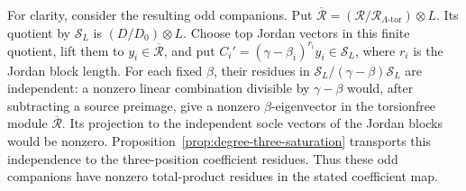 For clarity, consider the resulting odd companions.
Put $\overline{\mathcal R}=
(\mathcal R/\mathcal R_{\Lambda\text{-tor}})\otimes L$.
Its quotient by $\mathcal S_L$ is $(D/D_0)\otimes L$.
Choose top Jordan vectors in this finite quotient,
lift them to $y_i\in\overline{\mathcal R}$, and put
$C_i'=(\gamma-\beta_i)^{r_i}y_i\in\mathcal S_L$,
where $r_i$ is the Jordan block length.
For each fixed $\beta$, their residues in
$\mathcal S_L/(\gamma-\beta)\mathcal S_L$ are independent:
a nonzero linear combination divisible by $\gamma-\beta$
would, after subtracting a source preimage, give a nonzero
$\beta$-eigenvector in the torsionfree module
$\overline{\mathcal R}$. Its projection to the independent
socle vectors of the Jordan blocks would be nonzero.
Proposition~\ref{prop:degree-three-saturation} transports
this independence to the three-position coefficient
residues. Thus these odd companions have nonzero
total-product residues in the stated coefficient map.
